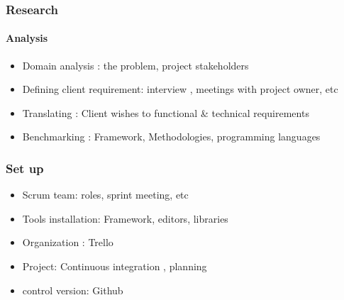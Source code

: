 \documentclass{beamer}
\begin{document}
\begin{frame}\frametitle{Research}\framesubtitle{Analysis }
\begin{itemize}
	\item Domain analysis : the problem, project stakeholders
	\item Defining client requirement: interview , meetings with project owner, etc
	\item Translating : Client wishes to functional \& technical requirements
	\item Benchmarking : Framework, Methodologies, programming languages
\end{itemize}
	
\end{frame}
\begin{frame}\frametitle{Set up}
\begin{itemize}
	\item Scrum team: roles, sprint meeting, etc
	\item Tools installation: Framework, editors, libraries 
	\item Organization : Trello 
	\item Project: Continuous integration , planning 
	\item control version: Github
\end{itemize}
	
\end{frame}
\end{document}
